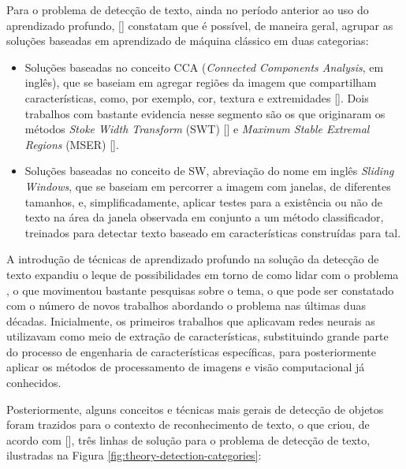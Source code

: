 Para o problema de detecção de texto, ainda no período anterior ao uso do aprendizado profundo, [] constatam que é 
possível, de maneira geral, agrupar as soluções baseadas em aprendizado de máquina clássico em duas categorias:

\begin{itemize}
    \item Soluções baseadas no conceito CCA (\textit{Connected Components Analysis}, em inglês), que se baseiam em agregar regiões da imagem que 
    compartilham características, como, por exemplo, cor, textura e extremidades []. Dois trabalhos com bastante evidencia 
    nesse segmento são os que originaram os métodos \textit{Stoke Width Transform} (SWT) [] e \textit{Maximum Stable Extremal Regions} 
    (MSER) [].

    \item Soluções baseadas no conceito de SW, abreviação do nome em inglês \textit{Sliding Windows}, que se baseiam em percorrer a imagem com janelas, 
    de diferentes tamanhos, e, simplificadamente, aplicar testes para a existência ou não de texto na área da janela observada em conjunto a um método 
    classificador, treinados para detectar texto baseado em características construídas para tal.
\end{itemize}

A introdução de técnicas de aprendizado profundo na solução da detecção de texto expandiu o leque de possibilidades em torno de como lidar com o problema
, o que movimentou bastante pesquisas sobre o tema, o que pode ser constatado com o número de novos trabalhos abordando o problema nas últimas duas décadas.
 Inicialmente, os primeiros trabalhos que aplicavam redes neurais as utilizavam como meio de extração de características, substituindo grande parte do 
 processo de engenharia de características específicas, para posteriormente aplicar os métodos de processamento de imagens e visão computacional já conhecidos.

Posteriormente, alguns conceitos e técnicas mais gerais de detecção de objetos foram trazidos para o contexto de reconhecimento de texto, o que criou, 
de acordo com [], três linhas de solução para o problema de detecção de texto, ilustradas na Figura \ref{fig:theory-detection-categories}:

